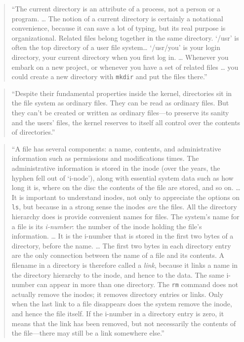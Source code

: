 \documentclass[]{tufte-book}
\begin{document}
\begin{quote}
``The current directory is an attribute of a process, not a person or a program. \ldots{} The notion of a
current directory is certainly a notational convenience, because it can save a lot of typing, but
its real purpose is organizational. Related files belong together in the same directory. `/usr' is
often the top directory of a user file system\ldots{} `/usr/you' is your login directory, your current
directory when you first log in. \ldots{} Whenever you embark on a new project, or whenever you have
a set of related files \ldots{} you could create a new directory with \texttt{mkdir} and put the files there.'' \citep{kernighan1984unix}
\end{quote}

\begin{quote}
``Despite their fundamental properties inside the kernel, directories sit in the file system as
ordinary files. They can be read as ordinary files. But they can't be created or written as
ordinary files---to preserve its sanity and the users' files, the kernel reserves to itself all
control over the contents of directories.'' \citep{kernighan1984unix}
\end{quote}

\begin{quote}
``A file has several components: a name, contents, and administrative information such as
permissions and modifications times. The administrative information is stored in the inode
(over the years, the hyphen fell out of `i-node'), along with essential system data such as
how long it is, where on the disc the contents of the file are stored, and so on. \ldots{}
It is important to understand inodes, not only to appreciate the options on \texttt{ls}, but because
in a strong sense the inodes \emph{are} the files. All the directory hierarchy does is provide
convenient names for files. The system's name for a file is its \emph{i-number}: the number of the
inode holding the file's information. \ldots{} It is the i-number that is stored in the first two bytes
of a directory, before the name. \ldots{}
The first two bytes in each directory entry are the only connection between the name of a file and its
contents. A filename in a directory is therefore called a \emph{link}, because it links a name in the
directory hierarchy to the inode, and hence to the data. The same i-number can appear in more than
one directory. The \texttt{rm} command does not actually remove the inodes; it removes directory entries
or links. Only when the last link to a file disappears does the system remove the inode, and hence
the file itself. If the i-number in a directory entry is zero, it means that the link has been
removed, but not necessarily the contents of the file---there may still be a link somewhere else.'' \citep{kernighan1984unix}
\end{quote}
\end{document}
